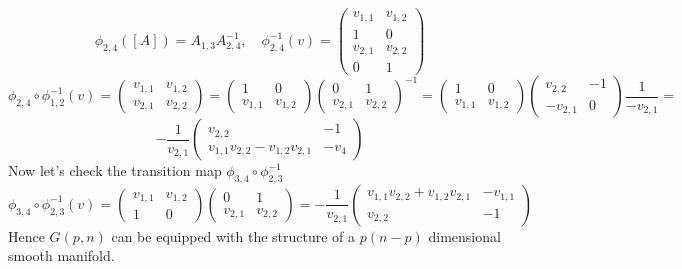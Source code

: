 \documentclass[11pt,a4paper]{report}
\begin{document}
$$ \phi_{2,4}([A]) = A_{1,3} A_{2,4}^{-1}, \quad \phi_{2,4}^{-1}(v) = 
\begin{pmatrix}
v_{1,1} & v_{1,2} \\
1 & 0 \\
v_{2,1} & v_{2,2} \\
0 & 1
\end{pmatrix}
$$
$$ \phi_{2,4} \circ \phi_{1,2}^{-1}(v) = 
\begin{pmatrix}
v_{1,1} & v_{1,2} \\
v_{2,1} & v_{2,2}
\end{pmatrix} =
\begin{pmatrix}
    1 & 0 \\
    v_{1,1} & v_{1,2}
\end{pmatrix}
\begin{pmatrix}
    0 & 1 \\
    v_{2,1} & v_{2,2}
\end{pmatrix} ^{-1}
= 
\begin{pmatrix}
    1 & 0 \\
    v_{1,1} & v_{1,2}
\end{pmatrix}
\begin{pmatrix}
    v_{2,2} & -1 \\
    -v_{2,1} & 0
\end{pmatrix} \frac{1}{-v_{2,1}} = 
$$
$$ -\frac{1}{v_{2,1}} \begin{pmatrix} v_{2,2} & -1 \\ v_{1,1} v_{2,2} - v_{1,2} v_{2,1} & -v_{4} \end{pmatrix}
$$
\newline
Now let's check the transition map $ \phi_{3,4} \circ \phi_{2,3}^{-1} $ 
$$ \phi_{3,4} \circ \phi_{2,3}^{-1} (v) =
\begin{pmatrix} v_{1,1} &  v_{1,2} \\ 1 & 0 \end{pmatrix} 
\begin{pmatrix} 0 & 1 \\ v_{2,1} & v_{2,2} \end{pmatrix} = 
-\frac{1}{v_{2,1}} \begin{pmatrix} v_{1,1} v_{2,2} + v_{1,2} v_{2,1} & -v_{1,1} \\ v_{2,2} & -1 \end{pmatrix}
$$ 
Hence $G(p,n)$ can be equipped with the structure of a $p (n-p) $ dimensional smooth manifold.
\end{document}
